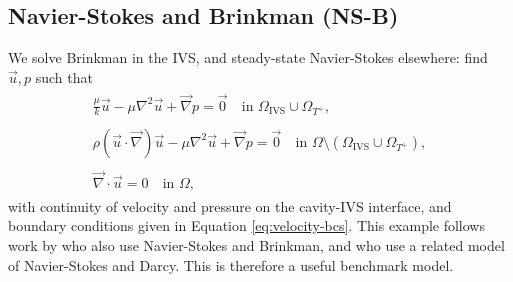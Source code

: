         \subsection{Navier-Stokes and Brinkman (NS-B)} \label{sec:modelling:blood-flow:ns+b}
            We solve Brinkman in the IVS, and steady-state Navier-Stokes elsewhere: find $\vec{u}, p$ such that
            \begin{subequations}
                \begin{align}
                    \begin{split}
                        \frac{\mu}{k} \vec{u} -\mu\nabla^2 \vec{u} + \vec{\nabla} p = \vec{0} &~ \text{in } \Omega_{\text{IVS}} \cup \Omega_{T^+},
                    \end{split}\\
                    \begin{split}
                        \rho(\vec{u} \cdot \vec{\nabla}) \vec{u} -\mu\nabla^2 \vec{u} + \vec{\nabla} p = \vec{0} &~ \text{in } \Omega \setminus (\Omega_{\text{IVS}} \cup \Omega_{T^+}),
                    \end{split}\\
                    \begin{split}
                        \vec{\nabla} \cdot \vec{u} = 0 &~ \text{in } \Omega,
                    \end{split}%
                \end{align}%
                \label{eq:ns-b}%
            \end{subequations}%
            with continuity of velocity and pressure on the cavity-IVS interface, and boundary conditions given in Equation \ref{eq:velocity-bcs}. This example follows work by \citeauthor{lecarpentierComputationalFluidDynamic2016} \cite{lecarpentierComputationalFluidDynamic2016} who also use Navier-Stokes and Brinkman, and \citeauthor{saghianAssociationPlacentalJets2017} \cite{saghianAssociationPlacentalJets2017} who use a related model of Navier-Stokes and Darcy. This is therefore a useful benchmark model.


